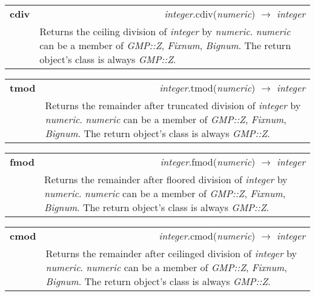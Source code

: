 \documentclass[pdftex,10pt]{article}
\newlength{\methwidth}
\newlength{\defnwidth}
\begin{document}
\begin{tabular}{p{\methwidth} l r}
\toprule
\textbf{cdiv} & & \textit{integer}.cdiv(\textit{numeric}) $\rightarrow$ \textit{integer}\\
\cmidrule(r){2-3}
& \multicolumn{2}{p{\defnwidth}}{
  Returns the ceiling division of \textit{integer} by \textit{numeric}.
  \textit{numeric} can be a member of \textit{GMP::Z}, \textit{Fixnum}, \textit{Bignum}.
  The return object's class is always \textit{GMP::Z}.
}
\end{tabular}
\newline\newline

\begin{tabular}{p{\methwidth} l r}
\toprule
\textbf{tmod} & & \textit{integer}.tmod(\textit{numeric}) $\rightarrow$ \textit{integer}\\
\cmidrule(r){2-3}
& \multicolumn{2}{p{\defnwidth}}{
  Returns the remainder after truncated division of \textit{integer} by \textit{numeric}.
  \textit{numeric} can be a member of \textit{GMP::Z}, \textit{Fixnum}, \textit{Bignum}.
  The return object's class is always \textit{GMP::Z}.
}
\end{tabular}
\newline\newline

\begin{tabular}{p{\methwidth} l r}
\toprule
\textbf{fmod} & & \textit{integer}.fmod(\textit{numeric}) $\rightarrow$ \textit{integer}\\
\cmidrule(r){2-3}
& \multicolumn{2}{p{\defnwidth}}{
  Returns the remainder after floored division of \textit{integer} by \textit{numeric}.
  \textit{numeric} can be a member of \textit{GMP::Z}, \textit{Fixnum}, \textit{Bignum}.
  The return object's class is always \textit{GMP::Z}.
}
\end{tabular}
\newline\newline

\begin{tabular}{p{\methwidth} l r}
\toprule
\textbf{cmod} & & \textit{integer}.cmod(\textit{numeric}) $\rightarrow$ \textit{integer}\\
\cmidrule(r){2-3}
& \multicolumn{2}{p{\defnwidth}}{
  Returns the remainder after ceilinged division of \textit{integer} by \textit{numeric}.
  \textit{numeric} can be a member of \textit{GMP::Z}, \textit{Fixnum}, \textit{Bignum}.
  The return object's class is always \textit{GMP::Z}.
}
\end{tabular}
\end{document}
